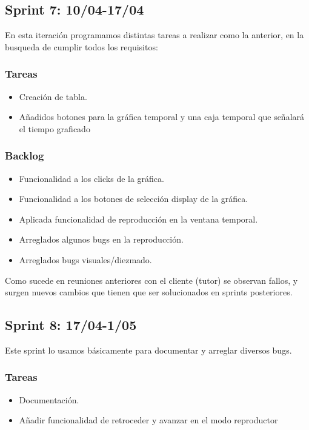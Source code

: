 \subsection{Sprint 7: 10/04-17/04}
En esta iteración programamos distintas tareas a realizar como la anterior, en la busqueda de cumplir todos los requisitos:
\subsubsection{Tareas}
\begin{itemize}
	\item Creación de tabla. 

	\item Añadidos botones para la gráfica temporal y una caja temporal que señalará el tiempo graficado

\end{itemize}


\subsubsection{Backlog}

\begin{itemize}
\item Funcionalidad a los clicks de la gráfica. 

\item Funcionalidad a los botones de selección display de la gráfica.

\item Aplicada funcionalidad de reproducción en la ventana temporal. 

\item Arreglados algunos bugs en la reproducción.

\item Arreglados bugs visuales/diezmado.

\end{itemize}


Como sucede en reuniones anteriores con el cliente (tutor) se observan fallos, y surgen nuevos cambios que tienen que ser solucionados en sprints posteriores.
\subsection{Sprint 8: 17/04-1/05}

Este sprint lo usamos básicamente para documentar y arreglar diversos bugs.

\subsubsection{Tareas}
\begin{itemize}
	\item Documentación.

	\item Añadir funcionalidad de retroceder y avanzar en el modo reproductor

\end{itemize}


